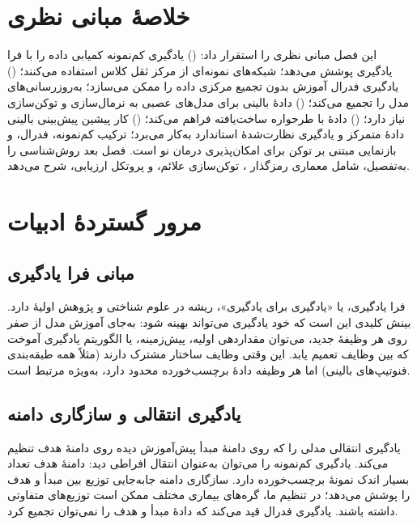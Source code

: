 \section{خلاصۀ مبانی نظری}

این فصل مبانی نظری را استقرار داد: () یادگیری کم‌نمونه کمیابی داده را با فرا یادگیری پوشش می‌دهد؛ شبکه‌های نمونه‌ای از مرکز ثقل کلاس استفاده می‌کنند؛ () یادگیری فدرال آموزش بدون تجمیع مرکزی داده را ممکن می‌سازد؛  به‌روزرسانی‌های مدل را تجمیع می‌کند؛ () دادۀ بالینی برای مدل‌های عصبی به نرمال‌سازی و توکن‌سازی نیاز دارد؛ ()  دادۀ  با طرحواره ساخت‌یافته فراهم می‌کند؛ () کار پیشین پیش‌بینی بالینی دادۀ متمرکز و یادگیری نظارت‌شدۀ استاندارد به‌کار می‌برد؛ ترکیب کم‌نمونه، فدرال، و بازنمایی مبتنی بر توکن برای امکان‌پذیری درمان نو است. فصل بعد روش‌شناسی را به‌تفصیل، شامل معماری رمزگذار ، توکن‌سازی علائم، و پروتکل ارزیابی، شرح می‌دهد.

\section{مرور گستردۀ ادبیات}

\subsection{مبانی فرا یادگیری}

فرا یادگیری، یا «یادگیری برای یادگیری»، ریشه در علوم شناختی و پژوهش اولیۀ  دارد. بینش کلیدی این است که خود یادگیری می‌تواند بهینه شود: به‌جای آموزش مدل از صفر روی هر وظیفۀ جدید، می‌توان مقداردهی اولیه، پیش‌زمینه، یا الگوریتم یادگیری آموخت که بین وظایف تعمیم یابد. این وقتی وظایف ساختار مشترک دارند (مثلاً همه طبقه‌بندی فنوتیپ‌های بالینی) اما هر وظیفه دادۀ برچسب‌خورده محدود دارد، به‌ویژه مرتبط است.

\subsection{یادگیری انتقالی و سازگاری دامنه}

یادگیری انتقالی مدلی را که روی دامنۀ مبدأ پیش‌آموزش دیده روی دامنۀ هدف تنظیم می‌کند. یادگیری کم‌نمونه را می‌توان به‌عنوان انتقال افراطی دید: دامنۀ هدف تعداد بسیار اندک نمونۀ برچسب‌خورده دارد. سازگاری دامنه جابه‌جایی توزیع بین مبدأ و هدف را پوشش می‌دهد؛ در تنظیم ما، گره‌های بیماری مختلف ممکن است توزیع‌های متفاوتی داشته باشند. یادگیری فدرال قید می‌کند که دادۀ مبدأ و هدف را نمی‌توان تجمیع کرد.

